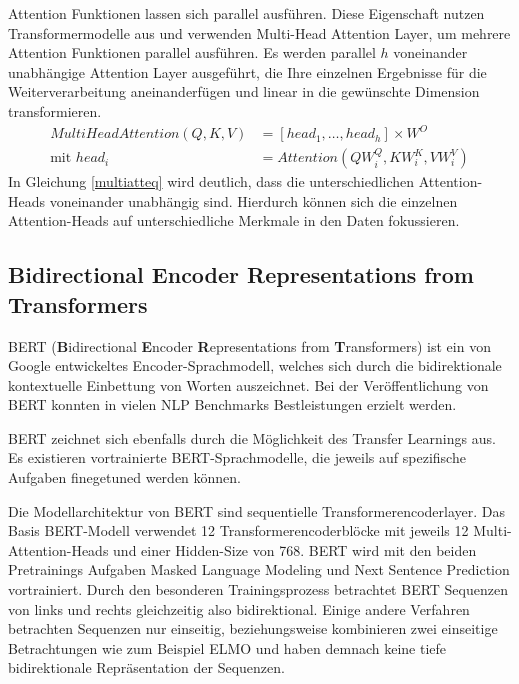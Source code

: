 Attention Funktionen lassen sich parallel ausführen. Diese Eigenschaft nutzen Transformermodelle aus und verwenden Multi-Head Attention Layer, um mehrere Attention Funktionen parallel ausführen.
Es werden parallel $h$ voneinander unabhängige Attention Layer ausgeführt, die Ihre einzelnen Ergebnisse für die Weiterverarbeitung aneinanderfügen und linear in die gewünschte Dimension transformieren. 
\begin{equation}
    \label{multiatteq}
    \begin{split}
    MultiHeadAttention(Q,K,V) &= [head_1, \ldots, head_h] \times W^{O} \\
    \text{mit } head_i &= Attention(QW_i^Q,KW_i^K,VW_i^V)
    \end{split}
\end{equation}
In Gleichung \ref{multiatteq} wird deutlich, dass die unterschiedlichen Attention-Heads voneinander unabhängig sind. Hierdurch können sich die einzelnen Attention-Heads auf unterschiedliche Merkmale in den Daten fokussieren.



    


\subsection{\textbf{B}idirectional \textbf{E}ncoder \textbf{R}epresentations from \textbf{T}ransformers}
BERT (\textbf{B}idirectional \textbf{E}ncoder \textbf{R}epresentations from \textbf{T}ransformers) ist ein von Google \citep{DBLP:journals/corr/abs-1810-04805} entwickeltes Encoder-Sprachmodell, welches sich durch die bidirektionale kontextuelle Einbettung von Worten auszeichnet.
Bei der Veröffentlichung von BERT konnten in vielen NLP Benchmarks Bestleistungen erzielt werden. 

BERT zeichnet sich ebenfalls durch die Möglichkeit des Transfer Learnings aus. Es existieren vortrainierte BERT-Sprachmodelle, die jeweils auf spezifische Aufgaben finegetuned werden können.

Die Modellarchitektur von BERT sind sequentielle Transformerencoderlayer. Das Basis BERT-Modell verwendet 12 Transformerencoderblöcke mit jeweils 12 Multi-Attention-Heads und einer Hidden-Size von 768.
BERT wird mit den beiden Pretrainings Aufgaben Masked Language Modeling und Next Sentence Prediction vortrainiert. Durch den besonderen Trainingsprozess betrachtet BERT Sequenzen von links und rechts gleichzeitig also bidirektional. Einige andere Verfahren betrachten Sequenzen nur einseitig, beziehungsweise kombinieren zwei einseitige Betrachtungen wie zum Beispiel ELMO \citep{elmo} und haben demnach keine tiefe bidirektionale Repräsentation der Sequenzen.

